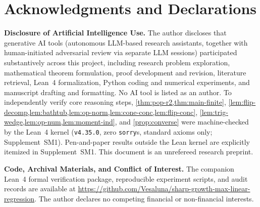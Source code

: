 \documentclass[11pt]{article}
\theoremstyle{plain}
\theoremstyle{remark}
\numberwithin{equation}{section}
\begin{document}
\section*{Acknowledgments and Declarations}
\textbf{Disclosure of Artificial Intelligence Use.} The author discloses that generative AI tools (autonomous LLM-based research assistants, together with human-initiated adversarial review via separate LLM sessions) participated substantively across this project, including research problem exploration, mathematical theorem formulation, proof development and revision, literature retrieval, Lean~4 formalization, Python coding and numerical experiments, and manuscript drafting and formatting. No AI tool is listed as an author. To independently verify core reasoning steps, \cref{thm:pop-r2,thm:main-finite}, \cref{lem:flip-decomp,lem:bathtub,lem:op-norm,lem:cone-conc,lem:flip-conc}, \cref{lem:trig-wedge,lem:op-num,lem:moment-ind}, and \cref{prop:converse} were machine-checked by the Lean~4 kernel (\texttt{v4.35.0}, zero \texttt{sorry}s, standard axioms only; Supplement~SM1). Pen-and-paper results outside the Lean kernel are explicitly itemized in Supplement~SM1. This document is an unrefereed research preprint.

\medskip
\noindent\textbf{Code, Archival Materials, and Conflict of Interest.} The companion Lean~4 formal verification package, reproducible experiment scripts, and audit records are available at \url{https://github.com/Vesaluna/sharp-growth-max-linear-regression}. The author declares no competing financial or non-financial interests.



\end{document}
